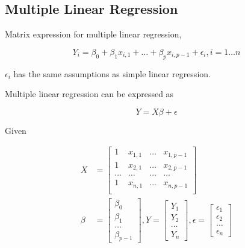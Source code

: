 \documentclass[10pt]{article}
\begin{document}
\begin{multicols}{3}
    \section{Multiple Linear Regression}

    Matrix expression for multiple linear regression,

    \begin{equation}
        Y_i = \beta_0 + \beta_1 x_{i, 1} + \dots + \beta_p x_{i, p - 1} + \epsilon_i, i = 1\dots n
    \end{equation}

    $\epsilon_i$ has the same assumptions as simple linear regression.

    Multiple linear regression can be expressed as

    \begin{equation} \label{multiple linear regression model}
        Y = X \beta + \epsilon
    \end{equation}

    Given

    \begin{align}
        \label{Multiple Regression X}
        X     & = \left[\begin{matrix}
                1     & x_{1,1} & \dots & x_{1, p - 1} \\
                1     & x_{2,1} & \dots & x_{2, p - 1} \\
                \dots & \dots   & \dots & \dots        \\
                1     & x_{n,1} & \dots & x_{n, p - 1} \\
            \end{matrix}\right]  \\
        \beta & = \left[\begin{matrix}
                \beta_0 \\ \beta_1 \\ \dots \\ \beta_{p - 1}
            \end{matrix}\right],
        Y = \left[\begin{matrix}
                Y_1 \\ Y_2 \\ \dots \\ Y_n
            \end{matrix}\right],
        \epsilon = \left[\begin{matrix}
                \epsilon_1 \\ \epsilon_2 \\ \dots \\ \epsilon_n
            \end{matrix}\right]
    \end{align}


\end{multicols}
\end{document}
